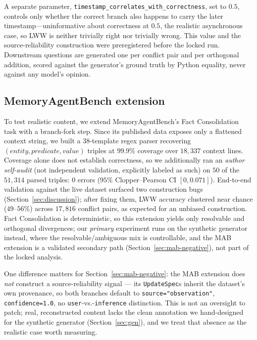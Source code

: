 \documentclass[11pt]{article}
\begin{document}
A separate parameter, \texttt{timestamp\_correlates\_with\_correctness}, set to
$0.5$, controls only whether the correct branch also happens to carry the later
timestamp---uninformative about correctness at $0.5$, the realistic
asynchronous case, so LWW is neither trivially right nor trivially wrong. This
value and the source-reliability construction were preregistered before the
locked run. Downstream questions are generated one per conflict pair and per
orthogonal addition, scored against the generator's ground truth by Python
equality, never against any model's opinion.

\subsection{MemoryAgentBench extension}
\label{sec:mab}

To test realistic content, we extend MemoryAgentBench's Fact Consolidation task
\citep{hu2025memoryagentbench} with a branch-fork step. Since its published
data exposes only a flattened context string, we built a 38-template regex
parser recovering $(entity, predicate, value)$ triples at $99.9\%$ coverage
over $18{,}337$ context lines. Coverage alone does not establish correctness,
so we additionally ran an \emph{author self-audit} (not
independent validation, explicitly labeled as such) on $50$ of the
$51{,}314$ parsed triples: $0$ errors ($95\%$ Clopper--Pearson CI
$[0,0.071]$). End-to-end validation against the live dataset surfaced two
construction bugs (Section~\ref{sec:discussion}); after fixing them, LWW
accuracy clustered near chance ($49$--$56\%$) across $17{,}816$ conflict
pairs, as expected for an unbiased construction. Fact Consolidation is
deterministic, so this extension yields only resolvable and orthogonal
divergences; our \emph{primary} experiment runs on the synthetic generator
instead, where the resolvable/ambiguous mix is controllable, and the MAB
extension is a validated secondary path (Section~\ref{sec:mab-negative}), not
part of the locked analysis.

One difference matters for Section~\ref{sec:mab-negative}: the MAB extension
does \emph{not} construct a source-reliability signal --- its
\texttt{UpdateSpec}s inherit the dataset's own provenance, so both branches
default to \texttt{source="observation"}, \texttt{confidence=1.0}, no
\texttt{user}-vs.-\texttt{inference} distinction. This is not an oversight to
patch; real, reconstructed content lacks the clean annotation we
hand-designed for the synthetic generator (Section~\ref{sec:gen}), and we
treat that absence as the realistic case worth measuring.
\end{document}
